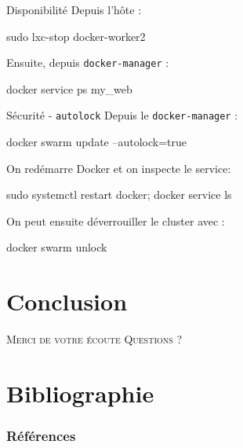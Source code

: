 \documentclass{cubeamer}
\begin{document}
\begin{frame}[fragile]{Disponibilité}
Depuis l'hôte :
\begin{bash}
sudo lxc-stop docker-worker2
\end{bash}

Ensuite, depuis \verb:docker-manager: :
\begin{bash}
docker service ps my_web
\end{bash}
\end{frame}

\begin{frame}[fragile]{Sécurité - \texttt{autolock}}
Depuis le \verb:docker-manager: :
\begin{bash}
docker swarm update --autolock=true
\end{bash}

On redémarre Docker et on inspecte le service:
\begin{bash}
sudo systemctl restart docker; docker service ls
\end{bash}

On peut ensuite déverrouiller le cluster avec :
\begin{bash}
docker swarm unlock
\end{bash}
\end{frame}

\section{Conclusion}

\begin{frame}[standout]
    \Huge\textsc{Merci de votre écoute}
    \vfill
    \LARGE\textsc{Questions ?}
\end{frame}

\section*{Bibliographie}

\begin{frame}[allowframebreaks]
    \frametitle{Références}
    \nocite{*}
    
    
\end{frame}
\end{document}
